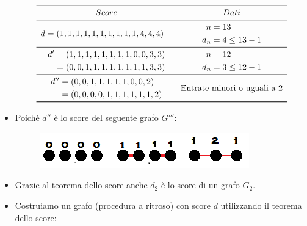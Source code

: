 \documentclass[10pt]{article}
\begin{document}
\begin{itemize}
	\[
	\begin{array}{cc}
		\toprule
		Score & Dati \\
		\midrule
		\begin{split} d &= (1,1,1,1,1,1,1,1,1,1,4,4,4) \end{split} & \begin{split} n &= 13 \\ d_n &= 4 \leq 13 -1 \end{split} \\
		\midrule
		\begin{split} d' &= (1,1,1,1,1,1,1,1,0,0,3,3) \\ &= (0,0,1,1,1,1,1,1,1,1,3,3) \end{split} & \begin{split} n &= 12 \\ d_n &= 3 \leq 12 -1 \end{split} \\
		\midrule
		\begin{split} d'' &= (0,0,1,1,1,1,1,0,0,2) \\ &= (0,0,0,0,1,1,1,1,1,1,2) \end{split} & \textrm{Entrate minori o uguali a 2} \\
		\bottomrule
	\end{array}
	\]
	\item
	Poichè $d''$ è lo score del seguente grafo $G'''$:
	\begin{center}
		\begin{figure}[h]
		\centering
		\includegraphics[width = 0.3\linewidth]{scoreGrafo_Esercizio5}
	\end{figure}
	\end{center}
	\item 
	Grazie al teorema dello score anche $d_2$ è lo score di un grafo $G_2$.
	\item
	Costruiamo un grafo (procedura a ritroso) con score $d$ utilizzando il teorema dello score:
	\end{itemize}
\end{document}

